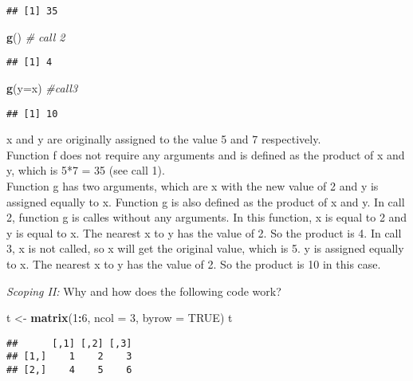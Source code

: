 \documentclass[12,]{article}
\newenvironment{Shaded}{\begin{snugshade}}{\end{snugshade}}
\newcommand{\KeywordTok}[1]{\textcolor[rgb]{0.13,0.29,0.53}{\textbf{#1}}}
\newcommand{\DataTypeTok}[1]{\textcolor[rgb]{0.13,0.29,0.53}{#1}}
\newcommand{\DecValTok}[1]{\textcolor[rgb]{0.00,0.00,0.81}{#1}}
\newcommand{\StringTok}[1]{\textcolor[rgb]{0.31,0.60,0.02}{#1}}
\newcommand{\CommentTok}[1]{\textcolor[rgb]{0.56,0.35,0.01}{\textit{#1}}}
\newcommand{\OtherTok}[1]{\textcolor[rgb]{0.56,0.35,0.01}{#1}}
\newcommand{\OperatorTok}[1]{\textcolor[rgb]{0.81,0.36,0.00}{\textbf{#1}}}
\newcommand{\NormalTok}[1]{#1}
\begin{document}
\begin{verbatim}
## [1] 35
\end{verbatim}

\begin{Shaded}
\begin{Highlighting}[]
\KeywordTok{g}\NormalTok{() }\CommentTok{# call 2}
\end{Highlighting}
\end{Shaded}

\begin{verbatim}
## [1] 4
\end{verbatim}

\begin{Shaded}
\begin{Highlighting}[]
\KeywordTok{g}\NormalTok{(}\DataTypeTok{y=}\NormalTok{x) }\CommentTok{#call3}
\end{Highlighting}
\end{Shaded}

\begin{verbatim}
## [1] 10
\end{verbatim}

x and y are originally assigned to the value 5 and 7 respectively.\\
Function f does not require any arguments and is defined as the product
of x and y, which is 5*7 = 35 (see call 1).\\
Function g has two arguments, which are x with the new value of 2 and y
is assigned equally to x. Function g is also defined as the product of x
and y. In call 2, function g is calles without any arguments. In this
function, x is equal to 2 and y is equal to x. The nearest x to y has
the value of 2. So the product is 4. In call 3, x is not called, so x
will get the original value, which is 5. y is assigned equally to x. The
nearest x to y has the value of 2. So the product is 10 in this case.

\emph{Scoping II:} Why and how does the following code work?

\begin{Shaded}
\begin{Highlighting}[]
\NormalTok{t <-}\StringTok{ }\KeywordTok{matrix}\NormalTok{(}\DecValTok{1}\OperatorTok{:}\DecValTok{6}\NormalTok{, }\DataTypeTok{ncol =} \DecValTok{3}\NormalTok{, }\DataTypeTok{byrow =} \OtherTok{TRUE}\NormalTok{) }
\NormalTok{t}
\end{Highlighting}
\end{Shaded}

\begin{verbatim}
##      [,1] [,2] [,3]
## [1,]    1    2    3
## [2,]    4    5    6
\end{verbatim}
\end{document}

